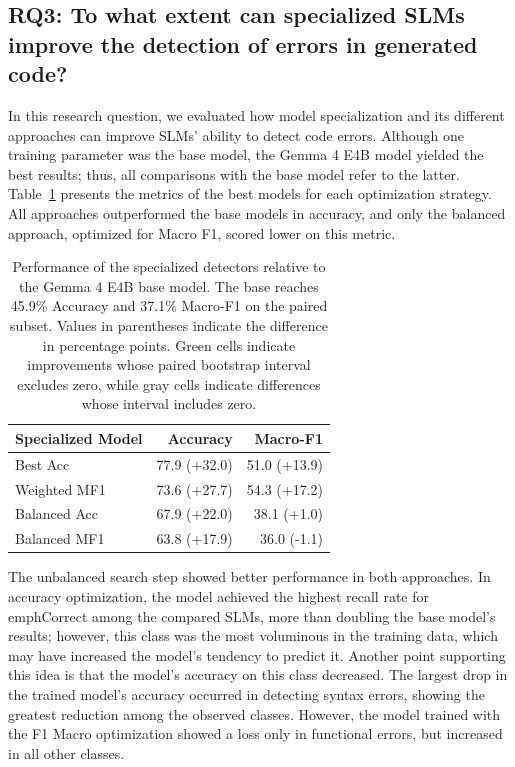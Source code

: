 \subsection{RQ3: To what extent can specialized SLMs improve the detection of errors in generated code?}

In this research question, we evaluated how model specialization and its different approaches can improve SLMs' ability to detect code errors. Although one training parameter was the base model, the Gemma 4 E4B model yielded the best results; thus, all comparisons with the base model refer to the latter. Table~\ref{tab:rq3_specialization} presents the metrics of the best models for each optimization strategy. All approaches outperformed the base models in accuracy, and only the balanced approach, optimized for Macro F1, scored lower on this metric.

\newcommand{\improvedcell}[1]{\cellcolor{green!20}#1}
\newcommand{\worsecell}[1]{\cellcolor{red!20}#1}
\newcommand{\uncertaincell}[1]{\cellcolor{gray!15}#1}

\begin{table}[htbp]
\centering
\caption{Performance of the specialized detectors relative to the Gemma 4 E4B base model. The base reaches 45.9\% Accuracy and 37.1\% Macro-F1 on the paired subset. Values in parentheses indicate the difference in percentage points. Green cells indicate improvements whose paired bootstrap interval excludes zero, while gray cells indicate differences whose interval includes zero.}
\label{tab:rq3_specialization}
\begin{tabular}{lrr}
\toprule
\textbf{Specialized Model} &
\textbf{Accuracy} &
\textbf{Macro-F1} \\
\midrule

Best Acc
& \improvedcell{77.9 (+32.0)}
& \improvedcell{51.0 (+13.9)}
\\

Weighted MF1
& \improvedcell{73.6 (+27.7)}
& \improvedcell{54.3 (+17.2)}
\\

Balanced Acc
& \improvedcell{67.9 (+22.0)}
& \uncertaincell{38.1 (+1.0)}
\\

Balanced MF1
& \improvedcell{63.8 (+17.9)}
& \uncertaincell{36.0 (-1.1)}
\\

\bottomrule
\end{tabular}
\end{table}

The unbalanced search step showed better performance in both approaches. In accuracy optimization, the model achieved the highest recall rate for emph{Correct} among the compared SLMs, more than doubling the base model's results; however, this class was the most voluminous in the training data, which may have increased the model's tendency to predict it. Another point supporting this idea is that the model's accuracy on this class decreased. The largest drop in the trained model's accuracy occurred in detecting syntax errors, showing the greatest reduction among the observed classes. However, the model trained with the F1 Macro optimization showed a loss only in functional errors, but increased in all other classes.

